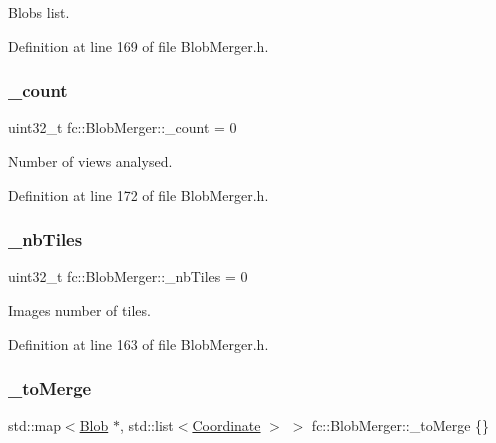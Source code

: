 Blobs list. 



Definition at line 169 of file Blob\+Merger.\+h.

\mbox{\label{classfc_1_1BlobMerger_abea5457da76db98d6a29dd06561d5bcf}} 
\subsubsection{\texorpdfstring{\+\_\+count}{\_count}}
{\footnotesize\ttfamily uint32\+\_\+t fc\+::\+Blob\+Merger\+::\+\_\+count = 0\hspace{0.3cm}{\ttfamily [private]}}



Number of views analysed. 



Definition at line 172 of file Blob\+Merger.\+h.

\mbox{\label{classfc_1_1BlobMerger_ad1b9d727d311831ea57e8f57161f8e13}} 
\subsubsection{\texorpdfstring{\+\_\+nb\+Tiles}{\_nbTiles}}
{\footnotesize\ttfamily uint32\+\_\+t fc\+::\+Blob\+Merger\+::\+\_\+nb\+Tiles = 0\hspace{0.3cm}{\ttfamily [private]}}



Images number of tiles. 



Definition at line 163 of file Blob\+Merger.\+h.

\mbox{\label{classfc_1_1BlobMerger_a290bb3c28c7042b92761ec2a55f017dc}} 
\subsubsection{\texorpdfstring{\+\_\+to\+Merge}{\_toMerge}}
{\footnotesize\ttfamily std\+::map$<$\hyperlink{classfc_1_1Blob}{Blob} $\ast$, std\+::list$<$\hyperlink{namespacefc_a7da125cb1e99553c27c07139ee8a62ca}{Coordinate} $>$ $>$ fc\+::\+Blob\+Merger\+::\+\_\+to\+Merge \{\}\hspace{0.3cm}{\ttfamily [private]}}



